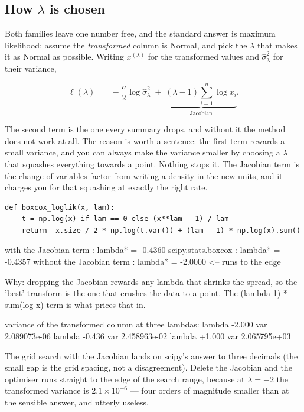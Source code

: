 \documentclass[11pt]{article}
\begin{document}
\subsection{How \texorpdfstring{$\lambda$}{lambda} is chosen}
\label{sec:lambda}

Both families leave one number free, and the standard answer is maximum
likelihood: assume the \emph{transformed} column is Normal, and pick the
$\lambda$ that makes it as Normal as possible. Writing $x^{(\lambda)}$ for the
transformed values and $\hat\sigma^2_\lambda$ for their variance,

\begin{equation}
  \ell(\lambda) \;=\;
  -\frac{n}{2}\log \hat\sigma^2_{\lambda}
  \;+\;
  \underbrace{(\lambda - 1)\sum_{i=1}^{n} \log x_i}_{\text{Jacobian}} .
  \label{eq:bclik}
\end{equation}

The second term is the one every summary drops, and without it the method does
not work at all. The reason is worth a sentence: the first term rewards a small
variance, and you can always make the variance smaller by choosing a $\lambda$
that squashes everything towards a point. Nothing stops it. The Jacobian term
is the change-of-variables factor from writing a density in the new units, and
it charges you for that squashing at exactly the right rate.

\begin{lstlisting}
def boxcox_loglik(x, lam):
    t = np.log(x) if lam == 0 else (x**lam - 1) / lam
    return -x.size / 2 * np.log(t.var()) + (lam - 1) * np.log(x).sum()
\end{lstlisting}
\begin{codeout}
with the Jacobian term    : lambda* = -0.4360
scipy.stats.boxcox        : lambda* = -0.4357
without the Jacobian term : lambda* = -2.0000  <-- runs to the edge

Why: dropping the Jacobian rewards any lambda that shrinks the spread,
so the 'best' transform is the one that crushes the data to a point.
The (lambda-1) * sum(log x) term is what prices that in.

variance of the transformed column at three lambdas:
   lambda -2.000   var 2.089073e-06
   lambda -0.436   var 2.458963e-02
   lambda +1.000   var 2.065795e+03
\end{codeout}

The grid search with the Jacobian lands on scipy's answer to three decimals
(the small gap is the grid spacing, not a disagreement). Delete the Jacobian
and the optimiser runs straight to the edge of the search range, because at
$\lambda = -2$ the transformed variance is $2.1\times10^{-6}$ --- four orders
of magnitude smaller than at the sensible answer, and utterly useless.
\end{document}
